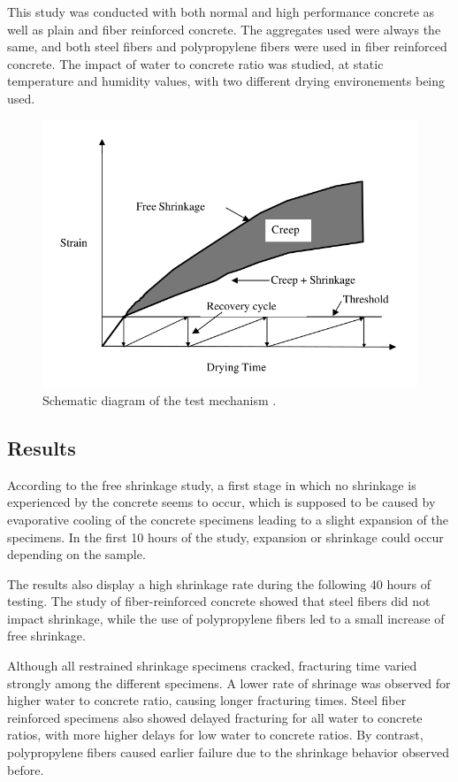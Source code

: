 \documentclass{report}
\begin{document}
This study was conducted with both normal and high performance concrete as
well as plain and fiber reinforced concrete. The aggregates used were always
the same, and both steel fibers and polypropylene fibers were used in fiber
reinforced concrete. The impact of water to concrete ratio was studied, at
static temperature and humidity values, with two different drying environements
being used.

\begin{figure}
  \centering
  \includegraphics[width=.5\linewidth]{fig/aci1}
  \caption{Schematic diagram of the test mechanism \cite{cscea}.}\label{aci1}
\end{figure}

\subsection{Results}
According to the free shrinkage study, a first stage in which no shrinkage is
experienced by the concrete seems to occur, which is supposed to be caused by
evaporative cooling of the concrete specimens leading to a slight expansion of
the specimens. In the first 10 hours of the study, expansion or shrinkage could
occur depending on the sample.

The results also display a high shrinkage rate during the following 40 hours of
testing. The study of fiber-reinforced concrete showed that steel fibers did
not impact shrinkage, while the use of polypropylene fibers led to a small
increase of free shrinkage.

Although all restrained shrinkage specimens cracked, fracturing time varied
strongly among the different specimens. A lower rate of shrinage was observed
for higher water to concrete ratio, causing longer fracturing times. Steel
fiber reinforced specimens also showed delayed fracturing for all water to
concrete ratios, with more higher delays for low water to concrete ratios. By
contrast, polypropylene fibers caused earlier failure due to the shrinkage
behavior observed before.
\end{document}
